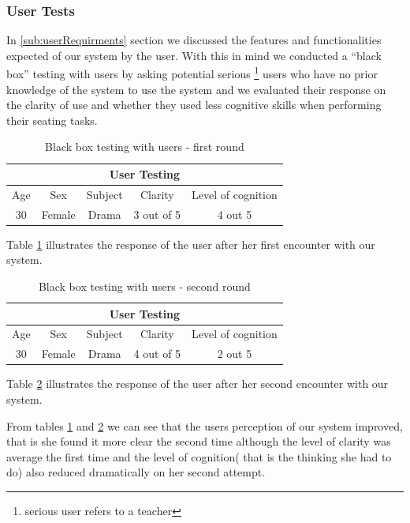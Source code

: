 \subsubsection{User Tests} \label{sub:user-testing}
In \ref{sub:userRequirments} section we discussed the features and functionalities expected of our system by the user. With this in mind we conducted a ``black box'' testing with users by asking potential serious \footnote{ serious user refers to a teacher} users who have no prior knowledge of the system to use the system and we evaluated their response on the clarity of use and whether they used less cognitive skills when performing their seating tasks.
\begin{table}
    \begin{tabular}{|c|c|c|c|c|}
        \hline
        \multicolumn{5}{|c|}{User Testing} \\
        \hline
        Age & Sex & Subject & Clarity & Level of cognition \\
        \hline
        30  & Female & Drama & 3 out of 5 & 4 out 5\\
        \hline
    \end{tabular}
    \caption{\label{tab:user-testing1} Black box testing with users - first round}
\end{table}


Table \ref{tab:user-testing1} illustrates the response of the user after her first encounter with our system.
\begin{table}
    \begin{tabular}{|c|c|c|c|c|}
        \hline
        \multicolumn{5}{|c|}{User Testing} \\
        \hline
        Age & Sex & Subject & Clarity & Level of cognition \\
        \hline
        30  & Female & Drama & 4 out of 5 & 2 out 5\\
        \hline
    \end{tabular}
    \caption{\label{tab:user-testing2} Black box testing with users - second round}
\end{table}


Table \ref{tab:user-testing2} illustrates the response of the user after her second encounter with our system.

From tables \ref{tab:user-testing1} and \ref{tab:user-testing2} we can see that the users perception of our system improved, that is she found it more clear the second time although the level of clarity was average the first time and the level of cognition( that is the thinking she had to do) also reduced dramatically on her second attempt. 
